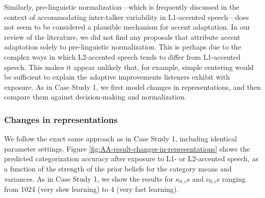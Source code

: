 \documentclass[
  11pt,
  man,floatsintext]{apa6}
\begin{document}
Similarly, pre-linguistic normalization---which is frequently discussed in the context of accommodating inter-talker variability in L1-accented speech---does not seem to be considered a plausible mechanism for accent adaptation. In our review of the literature, we did not find any proposals that attribute accent adaptation solely to pre-linguistic normalization. This is perhaps due to the complex ways in which L2-accented speech tends to differ from L1-accented speech. This makes it appear unlikely that, for example, simple centering would be sufficient to explain the adaptive improvements listeners exhibit with exposure. As in Case Study 1, we first model changes in representations, and then compare them against decision-making and normalization.

\hypertarget{changes-in-representations-1}{%
\subsubsection{Changes in representations}\label{changes-in-representations-1}}

We follow the exact same approach as in Case Study 1, including identical parameter settings.
Figure \ref{fig:AA-result-changes-in-representations} shows the predicted categorization accuracy after exposure to L1- or L2-accented speech, as a function of the strength of the prior beliefs for the category means and variances. As in Case Study 1, we show the results for \(\kappa_{0,c}\)s and \(\nu_{0,c}\)s ranging from 1024 (very slow learning) to 4 (very fast learning).
\end{document}

